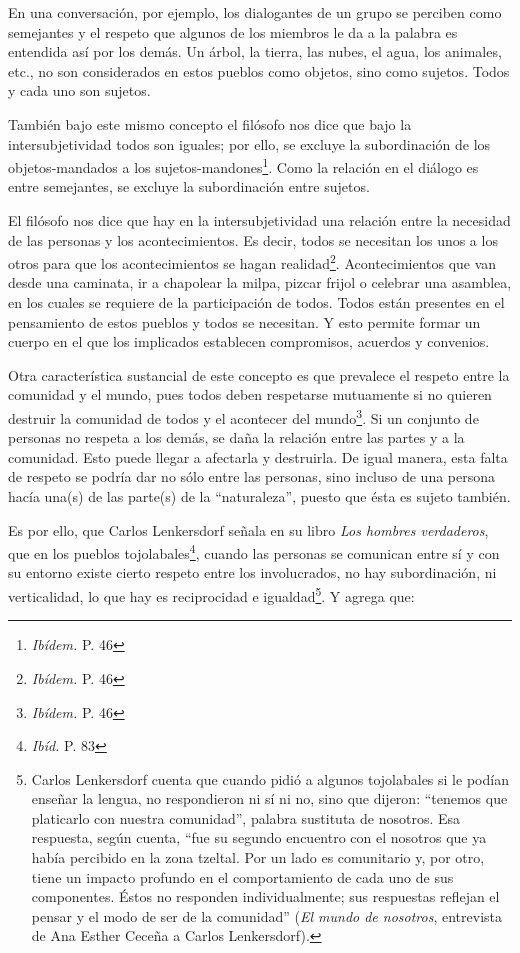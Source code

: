 \documentclass[oneside]{book}
\begin{document}
En una conversación, por ejemplo, los dialogantes de un grupo se perciben como semejantes y el respeto que algunos de los miembros le da a la palabra es entendida así por los demás. Un árbol, la tierra, las nubes, el agua, los animales, etc., no son considerados en estos pueblos como objetos, sino como sujetos. Todos y cada uno son sujetos.

También bajo este mismo concepto el filósofo nos dice que bajo la intersubjetividad todos son iguales; por ello, se excluye la subordinación de los objetos-mandados a los sujetos-mandones\footnote{\textit{Ibídem.} P. 46}. Como la relación en el diálogo es entre semejantes, se excluye la subordinación entre sujetos. 

El filósofo nos dice que hay en la intersubjetividad una relación entre la necesidad de las personas y los acontecimientos. Es decir, todos se necesitan los unos a los otros para que los acontecimientos se hagan realidad\footnote{\textit{Ibídem.} P. 46}. Acontecimientos que van desde una caminata, ir a chapolear la milpa, pizcar frijol o celebrar una asamblea, en los cuales se requiere de la participación de todos. Todos están presentes en el pensamiento de estos pueblos y todos se necesitan. Y esto permite formar un cuerpo en el que los implicados establecen compromisos, acuerdos y convenios.

Otra característica sustancial de este concepto es que prevalece el respeto entre la comunidad y el mundo, pues todos deben respetarse mutuamente si no quieren destruir la comunidad de todos y el acontecer del mundo\footnote{\textit{Ibídem.} P. 46}. Si un conjunto de personas no respeta a los demás, se daña la relación entre las partes y a la comunidad. Esto puede llegar a afectarla y destruirla. De igual manera, esta falta de respeto se podría dar no sólo entre las personas, sino incluso de una persona hacía una(s) de las parte(s) de la “naturaleza”, puesto que ésta es sujeto también.

Es por ello, que Carlos Lenkersdorf señala en su libro \textit{Los hombres verdaderos}, que en los pueblos tojolabales\footnote{\textit{Ibíd.} P. 83}, cuando las personas se comunican entre sí y con su entorno existe cierto respeto entre los involucrados, no hay subordinación, ni verticalidad, lo que hay es reciprocidad e igualdad\footnote{Carlos Lenkersdorf cuenta que cuando pidió a algunos tojolabales si le podían enseñar la lengua, no respondieron ni sí ni no, sino que dijeron: “tenemos que platicarlo con nuestra comunidad”, palabra sustituta de nosotros. Esa respuesta, según cuenta, “fue su segundo encuentro con el nosotros que ya había percibido en la zona tzeltal. Por un lado es comunitario y, por otro, tiene un impacto profundo en el comportamiento de cada uno de sus componentes. Éstos no responden individualmente; sus respuestas reflejan el pensar y el modo de ser de la comunidad” (\textit{El mundo de nosotros}, entrevista de Ana Esther Ceceña a Carlos Lenkersdorf).}. Y agrega que:
\end{document}
